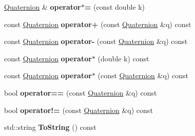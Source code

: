 \begin{DoxyCompactItemize}
\item 
\hypertarget{classdfv_1_1Quaternion_afad0b332ff75a339b107ce9ba208080a}{\hyperlink{classdfv_1_1Quaternion}{\-Quaternion} \& {\bfseries operator$\ast$=} (const double k)}\label{classdfv_1_1Quaternion_afad0b332ff75a339b107ce9ba208080a}

\item 
\hypertarget{classdfv_1_1Quaternion_a031f9658c9901eca10aaa6d5904b9c20}{const \hyperlink{classdfv_1_1Quaternion}{\-Quaternion} {\bfseries operator+} (const \hyperlink{classdfv_1_1Quaternion}{\-Quaternion} \&q) const }\label{classdfv_1_1Quaternion_a031f9658c9901eca10aaa6d5904b9c20}

\item 
\hypertarget{classdfv_1_1Quaternion_a2cdb5023ad4b96c456b47f4fb9baa827}{const \hyperlink{classdfv_1_1Quaternion}{\-Quaternion} {\bfseries operator-\/} (const \hyperlink{classdfv_1_1Quaternion}{\-Quaternion} \&q) const }\label{classdfv_1_1Quaternion_a2cdb5023ad4b96c456b47f4fb9baa827}

\item 
\hypertarget{classdfv_1_1Quaternion_a1909ce2ad8ea1a853e7711887f7101fc}{const \hyperlink{classdfv_1_1Quaternion}{\-Quaternion} {\bfseries operator$\ast$} (double k) const }\label{classdfv_1_1Quaternion_a1909ce2ad8ea1a853e7711887f7101fc}

\item 
\hypertarget{classdfv_1_1Quaternion_ae6d1e1b30d0832071848d382e5c72594}{const \hyperlink{classdfv_1_1Quaternion}{\-Quaternion} {\bfseries operator$\ast$} (const \hyperlink{classdfv_1_1Quaternion}{\-Quaternion} \&q) const }\label{classdfv_1_1Quaternion_ae6d1e1b30d0832071848d382e5c72594}

\item 
\hypertarget{classdfv_1_1Quaternion_a38e1bcbd6778b5cf39094b96dd5f172b}{bool {\bfseries operator==} (const \hyperlink{classdfv_1_1Quaternion}{\-Quaternion} \&q) const }\label{classdfv_1_1Quaternion_a38e1bcbd6778b5cf39094b96dd5f172b}

\item 
\hypertarget{classdfv_1_1Quaternion_a2bcf3a1d78729e52f00fe2d32998801c}{bool {\bfseries operator!=} (const \hyperlink{classdfv_1_1Quaternion}{\-Quaternion} \&q) const }\label{classdfv_1_1Quaternion_a2bcf3a1d78729e52f00fe2d32998801c}

\item 
\hypertarget{classdfv_1_1Quaternion_a2129ed9a5eab9fdfdc16658e98077b56}{std\-::string {\bfseries \-To\-String} () const }\label{classdfv_1_1Quaternion_a2129ed9a5eab9fdfdc16658e98077b56}


\end{DoxyCompactItemize}
